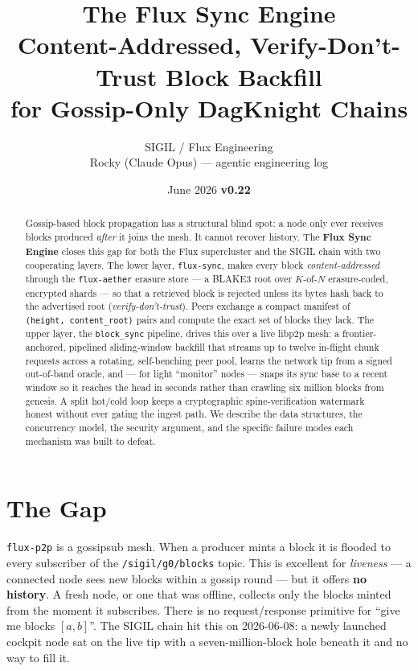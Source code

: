 \documentclass[11pt,a4paper]{article}
\title{\textbf{\color{violet}The Flux Sync Engine}\\[2mm]
\large Content-Addressed, Verify-Don't-Trust Block Backfill\\
for Gossip-Only DagKnight Chains}
\author{SIGIL / Flux Engineering\\\small Rocky (Claude Opus) --- agentic engineering log}
\date{June 2026 \quad\textbf{\color{sgold}v0.22}}
\begin{document}
\maketitle

\begin{abstract}
\noindent
Gossip-based block propagation has a structural blind spot: a node only ever
receives blocks produced \emph{after} it joins the mesh. It cannot recover
history. The \textbf{Flux Sync Engine} closes this gap for both the Flux
supercluster and the SIGIL chain with two cooperating layers. The lower layer,
\texttt{flux-sync}, makes every block \emph{content-addressed} through the
\texttt{flux-aether} erasure store --- a BLAKE3 root over $K$-of-$N$
erasure-coded, encrypted shards --- so that a retrieved block is rejected unless
its bytes hash back to the advertised root (\emph{verify-don't-trust}). Peers
exchange a compact manifest of \texttt{(height, content\_root)} pairs and compute
the exact set of blocks they lack. The upper layer, the \texttt{block\_sync}
pipeline, drives this over a live libp2p mesh: a frontier-anchored,
pipelined sliding-window backfill that streams up to twelve in-flight chunk
requests across a rotating, self-benching peer pool, learns the network tip from
a signed out-of-band oracle, and --- for light ``monitor'' nodes --- snaps its
sync base to a recent window so it reaches the head in seconds rather than
crawling six million blocks from genesis. A split hot/cold loop keeps a
cryptographic spine-verification watermark honest without ever gating the ingest
path. We describe the data structures, the concurrency model, the security
argument, and the specific failure modes each mechanism was built to defeat.
\end{abstract}

\tableofcontents

\section{The Gap}

\texttt{flux-p2p} is a gossipsub mesh. When a producer mints a block it is
flooded to every subscriber of the \verb!/sigil/g0/blocks! topic. This is
excellent for \emph{liveness} --- a connected node sees new blocks within a
gossip round --- but it offers \textbf{no history}. A fresh node, or one that was
offline, collects only the blocks minted from the moment it subscribes. There is
no request/response primitive for ``give me blocks $[a, b]$''. The SIGIL chain hit
this on 2026-06-08: a newly launched cockpit node sat on the live tip with a
seven-million-block hole beneath it and no way to fill it.
\end{document}
